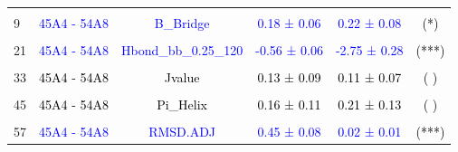 \documentclass{article}\usepackage[table]{xcolor}
\renewcommand{\$}{$} %
\begin{document}
\begin{center}
\begin{longtable}[t]{lccccc}
\cellcolor{gray!6}{3} & \cellcolor{gray!6}{\textcolor{black}{45A4 - 54A8}} & \cellcolor{gray!6}{\textcolor{black}{A\_Helix}} & \cellcolor{gray!6}{\textcolor{black}{-0.07 ± 0.08}} & \cellcolor{gray!6}{\textcolor{black}{-0.67 ± 0.29}} & \cellcolor{gray!6}{\textcolor{black}{( )}}\\
9 & \textcolor{blue}{45A4 - 54A8} & \textcolor{blue}{B\_Bridge} & \textcolor{blue}{0.18 ± 0.06} & \textcolor{blue}{0.22 ± 0.08} & \textcolor{black}{(*)}\\
\cellcolor{gray!6}{15} & \cellcolor{gray!6}{\textcolor{blue}{45A4 - 54A8}} & \cellcolor{gray!6}{\textcolor{blue}{B\_Strand}} & \cellcolor{gray!6}{\textcolor{blue}{0.45 ± 0.08}} & \cellcolor{gray!6}{\textcolor{blue}{0.88 ± 0.20}} & \cellcolor{gray!6}{\textcolor{black}{(***)}}\\
21 & \textcolor{blue}{45A4 - 54A8} & \textcolor{blue}{Hbond\_bb\_0.25\_120} & \textcolor{blue}{-0.56 ± 0.06} & \textcolor{blue}{-2.75 ± 0.28} & \textcolor{black}{(***)}\\
\cellcolor{gray!6}{27} & \cellcolor{gray!6}{\textcolor{blue}{45A4 - 54A8}} & \cellcolor{gray!6}{\textcolor{blue}{Hbond\_native\_bb\_0.25\_120}} & \cellcolor{gray!6}{\textcolor{blue}{-0.89 ± 0.08}} & \cellcolor{gray!6}{\textcolor{blue}{-3.66 ± 0.34}} & \cellcolor{gray!6}{\textcolor{black}{(***)}}\\
33 & \textcolor{black}{45A4 - 54A8} & \textcolor{black}{Jvalue} & \textcolor{black}{0.13 ± 0.09} & \textcolor{black}{0.11 ± 0.07} & \textcolor{black}{( )}\\
\cellcolor{gray!6}{39} & \cellcolor{gray!6}{\textcolor{black}{45A4 - 54A8}} & \cellcolor{gray!6}{\textcolor{black}{NOE\_repl\_merged}} & \cellcolor{gray!6}{\textcolor{black}{0.03 ± 0.05}} & \cellcolor{gray!6}{\textcolor{black}{-0.00 ± 0.00}} & \cellcolor{gray!6}{\textcolor{black}{( )}}\\
45 & \textcolor{black}{45A4 - 54A8} & \textcolor{black}{Pi\_Helix} & \textcolor{black}{0.16 ± 0.11} & \textcolor{black}{0.21 ± 0.13} & \textcolor{black}{( )}\\
\cellcolor{gray!6}{51} & \cellcolor{gray!6}{\textcolor{blue}{45A4 - 54A8}} & \cellcolor{gray!6}{\textcolor{blue}{Rgyr}} & \cellcolor{gray!6}{\textcolor{blue}{-0.02 ± 0.00}} & \cellcolor{gray!6}{\textcolor{blue}{-0.02 ± 0.00}} & \cellcolor{gray!6}{\textcolor{black}{(***)}}\\
57 & \textcolor{blue}{45A4 - 54A8} & \textcolor{blue}{RMSD.ADJ} & \textcolor{blue}{0.45 ± 0.08} & \textcolor{blue}{0.02 ± 0.01} & \textcolor{black}{(***)}\\

\end{longtable}
\end{center}
\end{document}
